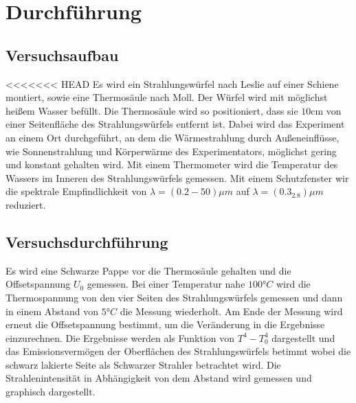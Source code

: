\section{Durchführung}
\label{sec:Durchführung}
\subsection{Versuchsaufbau}
<<<<<<< HEAD
Es wird ein Strahlungswürfel nach Leslie auf einer Schiene montiert, sowie eine
Thermosäule nach Moll. Der Würfel wird mit möglichst heißem Wasser befüllt. Die
Thermosäule wird so positioniert, dass sie $10\si{\centi\meter}$ von einer
Seitenfläche des Strahlungswürfels entfernt ist. Dabei wird das Experiment an
einem Ort durchgeführt, an dem die Wärmestrahlung durch Außeneinflüsse, wie
Sonnenstrahlung und Körperwärme des Experimentators, möglichst gering und konstant
gehalten wird. Mit einem Thermometer wird die Temperatur des Wassers im Inneren
des Strahlungswürfels gemessen. Mit einem Schutzfenster wir die spektrale
Empfindlichkeit von $\lambda=(0.2-50)\mu m$ auf $\lambda=(0.3_2.8)\mu m$ reduziert.

\subsection{Versuchsdurchführung}
Es wird eine Schwarze Pappe vor die Thermosäule gehalten und die Offsetspannung
$U_0$ gemessen.
Bei einer Temperatur nahe $100°C$ wird die Thermospannung von den vier
Seiten des Strahlungswürfels gemessen und dann in einem Abstand von $5°C$ die
Messung wiederholt. Am Ende der Messung wird erneut die Offsetspannung bestimmt,
um die Veränderung in die Ergebnisse einzurechnen. Die Ergebnisse werden als
Funktion von $T^4-T_0^4$ dargestellt und das Emissionsvermögen der Oberflächen
des Strahlungswürfels betimmt wobei die schwarz lakierte Seite als
Schwarzer Strahler betrachtet wird.
Die Strahlenintensität in Abhängigkeit von dem Abstand wird gemessen und
graphisch dargestellt.
